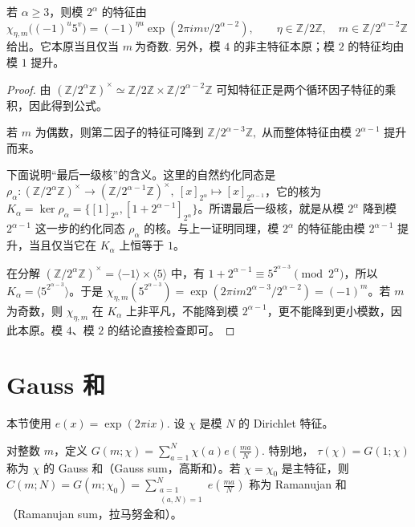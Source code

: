\documentclass[oneside]{AJbook}
\newcommand{\Z}{\mathbb Z}
\newcommand{\U}[1]{(\Z/#1\Z)^\times}
\newcommand{\Cyc}[1]{\Z/#1\Z}
\newcommand{\expi}[1]{\exp(2\pi i #1)}
\begin{document}
\begin{theorem}[二的幂模特征的指标组表示]
若 $\alpha\ge3$，则模 $2^\alpha$ 的特征由
\(
  \chi_{\eta,m}\bigl((-1)^u5^v\bigr)
  =
  (-1)^{\eta u}\expi{mv/2^{\alpha-2}},
  \qquad
  \eta\in\Cyc2,\quad m\in\Cyc{2^{\alpha-2}}
\)
给出。它本原当且仅当
\(
  m\ \text{为奇数}.
\)
另外，模 $4$ 的非主特征本原；模 $2$ 的特征均由模 $1$ 提升。
\end{theorem}

\begin{proof}
由
\(
  \U{2^\alpha}\simeq \Cyc2\times \Cyc{2^{\alpha-2}}
\)
可知特征正是两个循环因子特征的乘积，因此得到公式。

若 $m$ 为偶数，则第二因子的特征可降到
\(
  \Cyc{2^{\alpha-3}},
\)
从而整体特征由模 $2^{\alpha-1}$ 提升而来。

下面说明“最后一级核”的含义。这里的自然约化同态是
\(\rho_\alpha:\U{2^\alpha}\to\U{2^{\alpha-1}},\ [x]_{2^\alpha}\mapsto [x]_{2^{\alpha-1}}\)，它的核为
\(K_\alpha=\ker\rho_\alpha=\{[1]_{2^\alpha},[1+2^{\alpha-1}]_{2^\alpha}\}\)。所谓最后一级核，就是从模 \(2^\alpha\) 降到模 \(2^{\alpha-1}\) 这一步的约化同态 \(\rho_\alpha\) 的核。与上一证明同理，模 \(2^\alpha\) 的特征能由模 \(2^{\alpha-1}\) 提升，当且仅当它在 \(K_\alpha\) 上恒等于 \(1\)。

在分解 \(\U{2^\alpha}=\langle -1\rangle\times\langle5\rangle\) 中，有 \(1+2^{\alpha-1}\equiv5^{2^{\alpha-3}}\pmod {2^\alpha}\)，所以 \(K_\alpha=\langle 5^{2^{\alpha-3}}\rangle\)。于是
\(\chi_{\eta,m}(5^{2^{\alpha-3}})=\expi{m2^{\alpha-3}/2^{\alpha-2}}=(-1)^m\)。若 \(m\) 为奇数，则 \(\chi_{\eta,m}\) 在 \(K_\alpha\) 上非平凡，不能降到模 \(2^{\alpha-1}\)，更不能降到更小模数，因此本原。模 $4$、模 $2$ 的结论直接检查即可。
\end{proof}

\section{Gauss 和}

本节使用
\(
  e(x)=\exp(2\pi i x).
\)
设 $\chi$ 是模 $N$ 的 Dirichlet 特征。

\begin{definition}[Gauss 和]
对整数 $m$，定义
\(
  G(m;\chi)
  =
  \sum_{a=1}^{N}\chi(a)e\!\left(\frac{ma}{N}\right).
\)
特别地，
\(
  \tau(\chi)=G(1;\chi)
  \)
称为 $\chi$ 的 Gauss 和（Gauss sum，高斯和）。若 $\chi=\chi_0$ 是主特征，则
\(
  C(m;N)=G(m;\chi_0)
  =
  \sum_{\substack{a=1\\(a,N)=1}}^{N}
  e\!\left(\frac{ma}{N}\right)
 \)
称为 Ramanujan 和（Ramanujan sum，拉马努金和）。
\end{definition}
\end{document}
